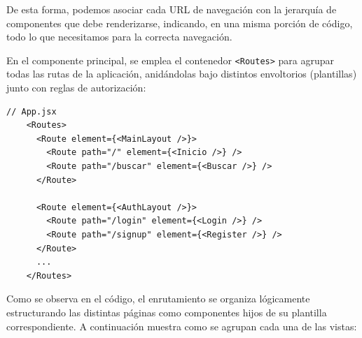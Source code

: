 \documentclass[11pt]{article}
\begin{document}
      De esta forma, podemos asociar cada URL de navegación con la jerarquía de
      componentes que debe renderizarse, indicando, en una misma porción de código,
      todo lo que necesitamos para la correcta navegación.

      En el componente principal, se emplea el contenedor \texttt{<Routes>} para
      agrupar todas las rutas de la aplicación, anidándolas bajo distintos
      envoltorios (plantillas) junto con reglas de autorización:

      \begin{lstlisting}[style=ReactStyle]
    // App.jsx
    <Routes>
      <Route element={<MainLayout />}>
        <Route path="/" element={<Inicio />} />
        <Route path="/buscar" element={<Buscar />} />
      </Route>

      <Route element={<AuthLayout />}>
        <Route path="/login" element={<Login />} />
        <Route path="/signup" element={<Register />} />
      </Route>
      ...
    </Routes>
\end{lstlisting}

      Como se observa en el código, el enrutamiento se organiza lógicamente
      estructurando las distintas páginas como componentes hijos de su plantilla
      correspondiente. A continuación muestra como se agrupan cada una de las vistas:
\end{document}
